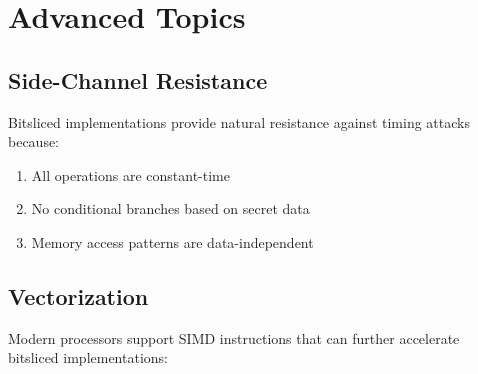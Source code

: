 \documentclass[11pt,a4paper]{article}
\begin{document}
\section{Advanced Topics}

\subsection{Side-Channel Resistance}

Bitsliced implementations provide natural resistance against timing attacks because:

\begin{enumerate}
    \item All operations are constant-time
    \item No conditional branches based on secret data
    \item Memory access patterns are data-independent
\end{enumerate}

\subsection{Vectorization}

Modern processors support SIMD instructions that can further accelerate bitsliced implementations:
\end{document}

